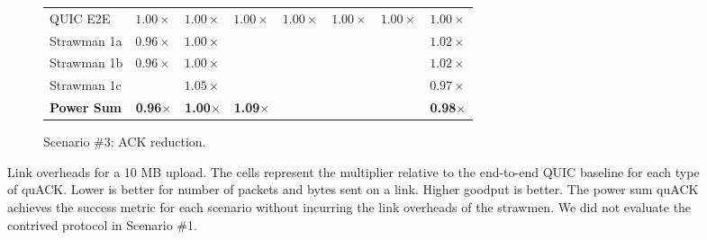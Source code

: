\begin{figure}[ht]
\begin{subfigure}{\columnwidth}
\begin{tabular}{lccccccc}
    \midrule
    QUIC E2E & $1.00\times$ & $1.00\times$ & $1.00\times$ & $1.00\times$ & $1.00\times$ & $1.00\times$ & $1.00\times$ \\
    Strawman 1a & $0.96\times$ & $1.00\times$ & \cellcolor{LightRed}{$9.94\times$} & \cellcolor{LighterRed}{$4.99\times$} & \cellcolor{LightGreen}{$0.04\times$} & \cellcolor{LightGreen}{$0.08\times$} & $1.02\times$ \\
    Strawman 1b & $0.96\times$ & $1.00\times$ & \cellcolor{LightRed}{$9.95\times$} & \cellcolor{LightRed}{$7.13\times$}      & \cellcolor{LightGreen}{$0.04\times$} & \cellcolor{LightGreen}{$0.08\times$} & $1.02\times$ \\
    Strawman 1c & \cellcolor{LightestRed}{$1.91\times$} & $1.05\times$ & \cellcolor{LightRed}{$9.73\times$} & \cellcolor{LightRed}{$7.41\times$}      & \cellcolor{LightGreen}{$0.04\times$} & \cellcolor{LightGreen}{$0.08\times$} & $0.97\times$ \\
    \bf \textcolor{black!50!blue}{Power Sum}    & \textcolor{black!50!blue}{\bf 0.96$\times$} & \textcolor{black!50!blue}{\bf 1.00$\times$} & \textcolor{black!50!blue}{\bf 1.09$\times$} & \cellcolor{LighterRed}{\textcolor{black!50!blue}{\bf 2.56$\times$}} & \cellcolor{LightGreen}{\textcolor{black!50!blue}{\bf 0.04$\times$}} & \cellcolor{LightGreen}{\textcolor{black!50!blue}{\bf 0.08$\times$}} & \textcolor{black!50!blue}{\bf 0.98$\times$} \\
    \bottomrule
  \end{tabular}
  \caption{Scenario \#3: ACK reduction.}
  \label{tab:packet-overhead:ackr}
\end{subfigure}
\caption{Link overheads for a 10 MB upload. The cells represent the multiplier
relative to the end-to-end QUIC baseline for each type of quACK\@.
Lower is better for number of packets and bytes sent on a link.
Higher goodput is better. The power sum quACK achieves the success metric
for each scenario without incurring the link overheads of the strawmen.
We did not evaluate the contrived protocol in Scenario \#1.
}
\label{tab:packet-overhead}
\end{figure}
